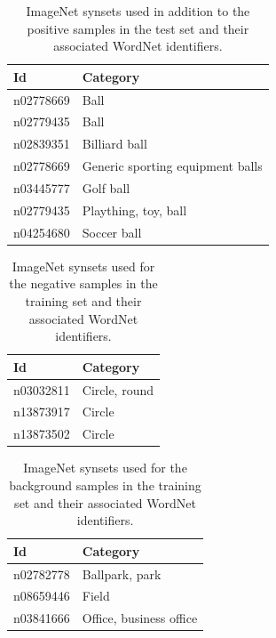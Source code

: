 \documentclass{llncs}
\begin{document}
{{			\begin{table}
				\centering
				\caption{ImageNet synsets used in addition to the positive samples in the test set and their associated WordNet identifiers.}
				\label{tab:test_set}
				\begin{tabularx}{\textwidth}{@{}lX@{}}
					\toprule
					\textbf{Id} & \textbf{Category} \\
					\midrule
						n02778669 & Ball \\
						n02779435 & Ball \\
						n02839351 & Billiard ball \\
						n02778669 & Generic sporting equipment balls \\
						n03445777 & Golf ball \\
						n02779435 & Plaything, toy, ball \\
						n04254680 & Soccer ball \\
					\bottomrule
				\end{tabularx}
			\end{table}

			\begin{table}
				\centering
				\caption{ImageNet synsets used for the negative samples in the training set and their associated WordNet identifiers.}
				\label{tab:negative_samples}
				\begin{tabularx}{\textwidth}{@{}lX@{}}
					\toprule
					\textbf{Id} & \textbf{Category} \\
					\midrule
						n03032811 & Circle, round \\
						n13873917 & Circle \\
						n13873502 & Circle \\
					\bottomrule
				\end{tabularx}
			\end{table}

			\begin{table}
				\centering
				\caption{ImageNet synsets used for the background samples in the training set and their associated WordNet identifiers.}
				\label{tab:background_samples}
				\begin{tabularx}{\textwidth}{@{}lX@{}}
					\toprule
					\textbf{Id} & \textbf{Category} \\
					\midrule
						n02782778 & Ballpark, park \\
						n08659446 & Field \\
						n03841666 & Office, business office \\
					\bottomrule
				\end{tabularx}
			\end{table}

		}
	}
\end{document}
